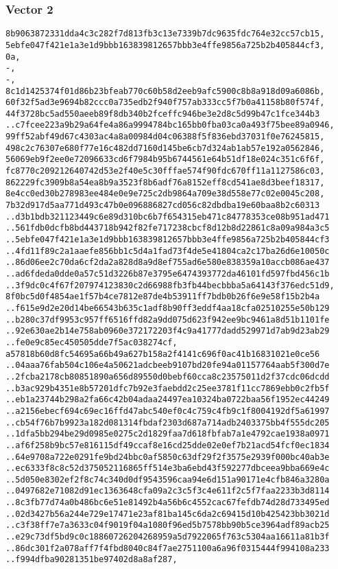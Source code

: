 \documentclass[
]{article}
\begin{document}
\hypertarget{vector-2-2}{%
\subsubsection{Vector 2}\label{vector-2-2}}

\begin{verbatim}
8b9063872331dda4c3c282f7d813fb3c13e7339b7dc9635fdc764e32cc57cb15,
5ebfe047f421e1a3e1d9bbb163839812657bbb3e4ffe9856a725b2b405844cf3,
0a,
-,
-,
8c1d1425374f01d86b23bfeab770c60b58d2eeb9afc5900c8b8a918d09a6086b,
60f32f5ad3e9694b82ccc0a735edb2f940f757ab333cc5f7b0a41158b80f574f,
44f3728bc5ad550aeeb89f8db340b2fceffc946be3e2d8c5d99b47c1fce344b3
..c7fcee223a9b29a64fe4a86a9994784bc165bb0fba03ca0a493f75bee89a0946,
99ff52abf49d67c4303ac4a8a00984d04c06388f5f836ebd37031f0e76245815,
498c2c76307e680f77e16c482dd7160d145be6cb7d324ab1ab57e192a0562846,
56069eb9f2ee0e72096633cd6f7984b95b6744561e64b51df18e024c351c6f6f,
fc8770c209212640742d53e2f40e5c30fffae574f90fdc670ff11a1127586c03,
862229fc3909b8a54ea8b9a3523f8b6adf76a8152eff8cd541ae8d3beef18317,
8e4cc0ed30b278983ee484e0e9e725c2db9864a709e38d558e77c02e0045c208,
7b32d917d5aa771d493c47b0e096886827cd056c82dbdba19e60baa8b2c60313
..d3b1bdb321123449c6e89d310bc6b7f654315eb471c84778353ce08b951ad471
..561fdb0dcfb8bd443718b942f82fe717238cbcf8d12b8d22861c8a09a984a3c5
..5ebfe047f421e1a3e1d9bbb163839812657bbb3e4ffe9856a725b2b405844cf3
..4fd11f89c2a1aaefe856bb1c5d4a1fad73f4de5e41804ca2c17ba26d6e10050c
..86d06ee2c70da6cf2da2a828d8a9d8ef755ad6e580e838359a10accb086ae437
..ad6fdeda0dde0a57c51d3226b87e3795e6474393772da46101fd597fbd456c1b
..3f9dc0c4f67f207974123830c2d66988fb3fb44becbbba5a64143f376edc51d9,
8f0bc5d0f4854ae1f57b4ce7812e87de4b53911ff7bdb0b26f6e9e58f15b2b4a
..f615e9d2e20d14be66543b635c1adf8b90ff3eddf4aa18cfa02510255e50b129
..b280c37df9953c957ff6516ffd82a9dd075d623f942ee9bc9461a8d51b1101fe
..92e630ae2b14e758ab0960e372172203f4c9a41777dadd529971d7ab9d23ab29
..fe0e9c85ec450505dde7f5ac038274cf,
a57818b60d8fc54695a66b49a627b158a2f4141c696f0ac41b16831021e0ce56
..04aaa76fab504c106e4a50621adcbeeb9107bd20fe94a01157764aab5f300d7e
..2fcba2178cb80851890a656d89550d0bebf60cca8c23575011d2f37cdc06dcdd
..b3ac929b4351e8b57201dfc7b92e3faebdd2c25ee3781f11cc7869ebb0c2fb5f
..eb1a23744b298a2fa66c42b04adaa24497ea10324ba0722baa56f1952ec44249
..a2156ebecf694c69ec16ffd47abc540ef0c4c759c4fb9c1f8004192df5a61997
..cb54f76b7b9923a182d081314fbdaf2303d687a714adb2403375bb4f555dc205
..1dfa5bb294be29d0985e0275c2d1829faa7d618fbfab7a1e4792cae1938a0971
..af6f258b9bc57e816115df49ccaf8e16cd25dde02e0ef7b21acd54fcf0ec1834
..64e9708a722e0291fe9bd24bbc0af5850c63df29f2f3575e2939f000bc40ab3e
..ec6333f8c8c52d375052116865ff514e3ba6ebd43f592277dbceea9bba669e4c
..5d050e8302ef2f8c74c340d0df9543596caa94e6d151a90171e4cfb846a3280a
..0497682e71082d91ec1363648cfa09a2c3c5f3c4e611f2c5f7faa2233b3d8114
..8c3fb77d74a0b486bc6e51e81492b4a56b6c4552cac67fefdb74d28d733495ed
..02d3427b56a244e729e17471e23af81ba145c6da2c69415d10b425423bb3021d
..c3f38ff7e7a3633c04f9019f04a1080f96ed5b7578bb90b5ce3964adf89acb25
..e29c73df5bd9c0c18860726204268959a5d7922065f763c5304aa16611a81b3f
..86dc301f2a078aff7f4fbd8040c84f7ae2751100a6a96f0315444f994108a233
..f994dfba90281351be97402d8a8af287,
\end{verbatim}
\end{document}
